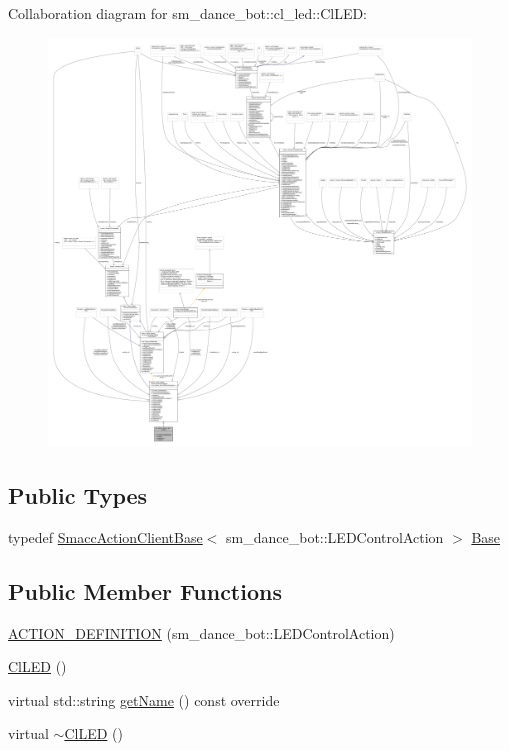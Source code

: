 Collaboration diagram for sm\+\_\+dance\+\_\+bot\+:\+:cl\+\_\+led\+:\+:Cl\+L\+ED\+:
\nopagebreak
\begin{figure}[H]
\begin{center}
\leavevmode
\includegraphics[width=350pt]{classsm__dance__bot_1_1cl__led_1_1ClLED__coll__graph}
\end{center}
\end{figure}
\subsection*{Public Types}
\begin{DoxyCompactItemize}
\item 
typedef \hyperlink{classsmacc_1_1client__bases_1_1SmaccActionClientBase_af38f27dd26f8a87fea6b3eaa4a84e604}{Smacc\+Action\+Client\+Base}$<$ sm\+\_\+dance\+\_\+bot\+::\+L\+E\+D\+Control\+Action $>$ \hyperlink{classsm__dance__bot_1_1cl__led_1_1ClLED_a4f98a115ef631256290aded5fb3770e1}{Base}
\end{DoxyCompactItemize}
\subsection*{Public Member Functions}
\begin{DoxyCompactItemize}
\item 
\hyperlink{classsm__dance__bot_1_1cl__led_1_1ClLED_a810154a450e6239169177a43e7d17394}{A\+C\+T\+I\+O\+N\+\_\+\+D\+E\+F\+I\+N\+I\+T\+I\+ON} (sm\+\_\+dance\+\_\+bot\+::\+L\+E\+D\+Control\+Action)
\item 
\hyperlink{classsm__dance__bot_1_1cl__led_1_1ClLED_a6b01355fcaf2817d9f9694dc2d8c713c}{Cl\+L\+ED} ()
\item 
virtual std\+::string \hyperlink{classsm__dance__bot_1_1cl__led_1_1ClLED_aa0a9fb92df96fb1bbba35c78fbe4119d}{get\+Name} () const override
\item 
virtual \hyperlink{classsm__dance__bot_1_1cl__led_1_1ClLED_add9ff40d28e1d31d77e1a2ff92e79fd2}{$\sim$\+Cl\+L\+ED} ()
\end{DoxyCompactItemize}
